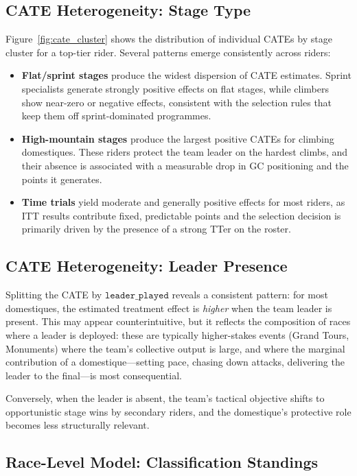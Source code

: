 \subsection{CATE Heterogeneity: Stage Type}

Figure~\ref{fig:cate_cluster} shows the distribution of individual CATEs by stage cluster for a top-tier rider. Several patterns emerge consistently across riders:

\begin{itemize}
    \item \textbf{Flat/sprint stages} produce the widest dispersion of CATE estimates. Sprint specialists generate strongly positive effects on flat stages, while climbers show near-zero or negative effects, consistent with the selection rules that keep them off sprint-dominated programmes.
    \item \textbf{High-mountain stages} produce the largest positive CATEs for climbing domestiques. These riders protect the team leader on the hardest climbs, and their absence is associated with a measurable drop in GC positioning and the points it generates.
    \item \textbf{Time trials} yield moderate and generally positive effects for most riders, as ITT results contribute fixed, predictable points and the selection decision is primarily driven by the presence of a strong TTer on the roster.
\end{itemize}

\subsection{CATE Heterogeneity: Leader Presence}

Splitting the CATE by $\texttt{leader\_played}$ reveals a consistent pattern: for most domestiques, the estimated treatment effect is \emph{higher} when the team leader is present. This may appear counterintuitive, but it reflects the composition of races where a leader is deployed: these are typically higher-stakes events (Grand Tours, Monuments) where the team's collective output is large, and where the marginal contribution of a domestique---setting pace, chasing down attacks, delivering the leader to the final---is most consequential.

Conversely, when the leader is absent, the team's tactical objective shifts to opportunistic stage wins by secondary riders, and the domestique's protective role becomes less structurally relevant.

\subsection{Race-Level Model: Classification Standings}

